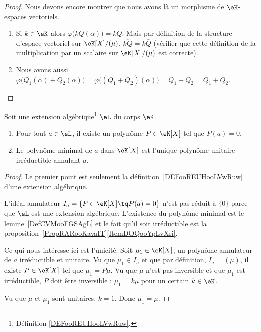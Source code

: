 \begin{proof}
    Nous devons encore montrer que nous avons là un morphisme de \( \eK\)-espaces vectoriels.
    \begin{enumerate}
        \item
            Si \( k\in \eK\) alors \( \varphi\big( kQ(\alpha) \big)=\overline{ kQ }\). Mais par définition de la structure d'espace vectoriel sur \( \eK[X]/(\mu)\), \( \overline{ kQ }=k\bar Q\) (vérifier que cette définition de la multiplication par un scalaire sur \( \eK[X]/(\mu)\) est correcte).
        \item
            Nous avons aussi \( \varphi\big( Q_1(\alpha)+Q_2(\alpha) \big)=\varphi\big( (Q_1+Q_2)(\alpha) \big)=\overline{ Q_1+Q_2 }=\bar Q_1+\bar Q_2\).
    \end{enumerate}
\end{proof}

\begin{proposition}      \label{PROPooALFJooDjmIcb}
    Soit une extension algébrique\footnote{Définition \ref{DEFooREUHooLVwRuw}.} \( \eL\) du corps $\eK$.
    \begin{enumerate}
        \item
            Pour tout \( a\in \eL\), il existe un polynôme \( P\in \eK[X]\) tel que \( P(a)=0\).
        \item       \label{ITEMooEFNFooKYqXDk}
            Le polynôme minimal de \( a\) dans \( \eK[X]\) est l'unique polynôme unitaire irréductible annulant \( a\).
    \end{enumerate}
\end{proposition}

\begin{proof}
    Le premier point est seulement la définition~\ref{DEFooREUHooLVwRuw} d'une extension algébrique.

    L'idéal annulateur \( I_a=\{ P\in \eK[X]\tq P(a)=0 \}\) n'est pas réduit à \( \{ 0 \}\) parce que \( \eL\) est une extension algébrique. L'existence du polynôme minimal est le lemme~\ref{DefCVMooFGSAgL} et le fait qu'il soit irréductible est la proposition~\ref{PropRARooKavaIT}\ref{ItemDOQooYpLvXri}.

    Ce qui nous intéresse ici est l'unicité. Soit \( \mu_1\in \eK[X]\), un polynôme annulateur de \( a\) irréductible et unitaire. Vu que \( \mu_1\in I_a\) et que par définition, \( I_a=(\mu)\), il existe \( P\in \eK[X]\) tel que \( \mu_1=P\mu\). Vu que \( \mu\) n'est pas inversible et que \( \mu_1\) est irréductible, \( P\) doit être inversible : \( \mu_1=k\mu\) pour un certain \( k\in \eK\).

    Vu que \( \mu\) et \( \mu_1\) sont unitaires, \( k=1\). Donc \( \mu_1=\mu\).
\end{proof}

